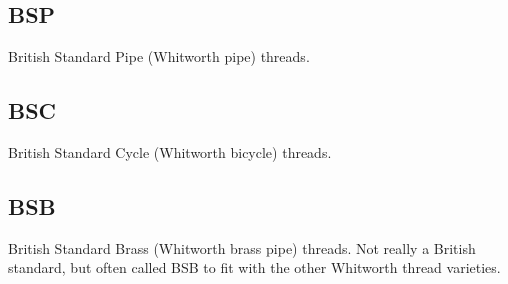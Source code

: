 \subsection{BSP}
British Standard Pipe (Whitworth pipe) threads.
\clearpage

\subsection{BSC}
British Standard Cycle (Whitworth bicycle) threads.
\clearpage

\subsection{BSB}
British Standard Brass (Whitworth brass pipe) threads.  Not really a British standard, but often called BSB to fit with the other Whitworth thread varieties.
\clearpage

